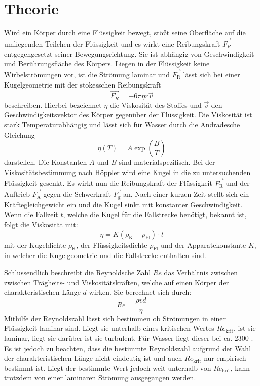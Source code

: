 
\section{Theorie}
\label{sec:Theorie}
Wird ein Körper durch eine Flüssigkeit bewegt, stößt seine Oberfläche auf die
umliegenden Teilchen der Flüssigkeit und es wirkt eine Reibungskraft $\vec{F_R}$ entgegengesetzt
seiner Bewegungsrichtung.
 Sie ist abhängig von
Geschwindigkeit und Berührungsfläche des Körpers. Liegen in der Flüssigkeit
keine Wirbelströmungen vor, ist die Strömung laminar und $\vec{F_\text{R}}$ lässt sich
bei einer Kugelgeometrie mit der stokesschen Reibungskraft
\begin{equation}
  \vec{F_R} = -6 \pi \eta r \vec{v}\label{stokeR}
  \end{equation}
  beschreiben. Hierbei bezeichnet $\eta$ die Viskosität des Stoffes und $\vec{v}$ den Geschwindigkeitsvektor des Körper gegenüber der Flüssigkeit. Die Viskosität ist
  stark Temperaturabhängig und lässt sich für Wasser durch die Andradesche
  Gleichung
  \begin{equation}
    \eta(T) = A \exp\left(\frac{B}{T}\right)\label{andra}
    \end{equation}
darstellen. Die Konstanten $A$ und $B$ sind materialspezifisch.
Bei der Viskositätsbestimmung nach Höppler wird eine Kugel in die zu untersuchenden
Flüssigkeit gesenkt. Es wirkt nun die Reibungskraft der Flüssigkeit $\vec{F_\text{R}}$ und der Auftrieb $\vec{F_\text{A}}$ gegen die
Schwerkraft $\vec{F_\text{g}}$ an. Nach einer kurzen Zeit stellt sich ein Kräftegleichgewicht ein und
 die Kugel sinkt mit konstanter Geschwindigkeit. Wenn die Fallzeit $t$, welche
  die Kugel für die Fallstrecke benötigt, bekannt ist, folgt die Viskosität mit:
  \begin{equation}
    \eta = K(\rho_\text{K} - \rho_\text{Fl})\cdot t\label{visko}
    \end{equation}
mit der Kugeldichte $\rho_\text{K}$, der Flüssigkeitsdichte $\rho_\text{Fl}$ und der
Apparatekonstante $K$, in welcher die Kugelgeometrie und die Fallstrecke enthalten sind.

Schlussendlich beschreibt die Reynoldsche Zahl $Re$ das Verhältnis zwischen
zwischen Trägheits- und Viskositätskräften, welche auf einen Körper der
charakteristischen Länge $d$ wirken. Sie berechnet sich durch:
\begin{equation}
  Re = \frac{\rho v d}{\eta}\label{Re}
  \end{equation}
  Mithilfe der Reynoldszahl lässt sich bestimmen ob Strömungen in einer
  Flüssigkeit laminar sind. Liegt sie unterhalb eines kritischen Wertes $Re_\text{krit}$, ist
  sie laminar, liegt sie darüber ist sie turbulent. Für Wasser liegt dieser bei ca. $2300$ \cite{Rekrit}.
Es ist jedoch zu beachten, dass die bestimmte Reynoldszahl aufgrund der Wahl der charakteristischen Länge nicht eindeutig ist und auch
$Re_\text{krit}$ nur empirisch bestimmt ist. Liegt der bestimmte Wert jedoch weit unterhalb
 von $Re_\text{krit}$, kann trotzdem von einer laminaren Strömung ausgegangen werden.
